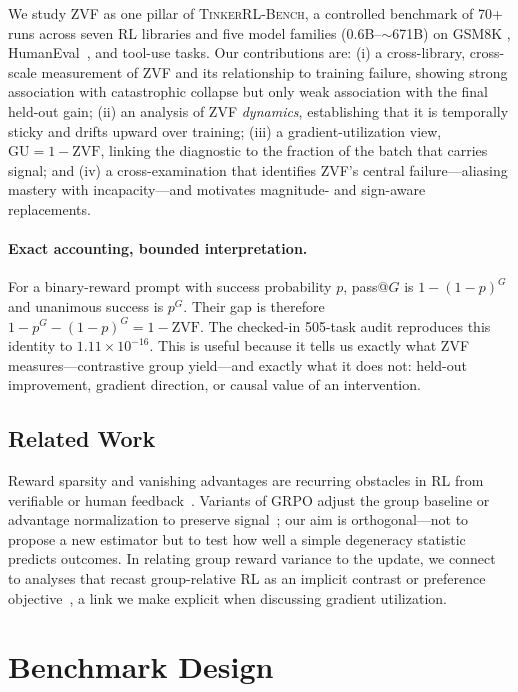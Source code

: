 \documentclass{article}
\newcommand{\ours}{\textsc{TinkerRL-Bench}}
\begin{document}
We study ZVF as one pillar of \ours{}, a controlled benchmark of 70+ runs across
seven RL libraries and five model families ($0.6$B--$\sim$671B) on GSM8K
\citep{cobbe2021training}, HumanEval~\citep{chen2021codex}, and tool-use tasks.
Our contributions are: (i) a cross-library, cross-scale measurement of ZVF and its
relationship to training failure, showing strong association with catastrophic
collapse but only weak association with the final held-out gain; (ii) an analysis
of ZVF \emph{dynamics}, establishing that it is temporally sticky and drifts upward
over training; (iii) a gradient-utilization view, $\mathrm{GU} = 1 - \mathrm{ZVF}$,
linking the diagnostic to the fraction of the batch that carries signal; and (iv) a
cross-examination that identifies ZVF's central failure---aliasing mastery with
incapacity---and motivates magnitude- and sign-aware replacements.

\paragraph{Exact accounting, bounded interpretation.}
For a binary-reward prompt with success probability $p$, pass@$G$ is
$1-(1-p)^G$ and unanimous success is $p^G$. Their gap is therefore
$1-p^G-(1-p)^G=1-\mathrm{ZVF}$. The checked-in 505-task audit reproduces this
identity to $1.11\times10^{-16}$. This is useful because it tells us exactly
what ZVF measures---contrastive group yield---and exactly what it does not:
held-out improvement, gradient direction, or causal value of an intervention.

\subsection{Related Work}
\label{sec:p2-related}
Reward sparsity and vanishing advantages are recurring obstacles in RL from
verifiable or human feedback~\citep{christiano2017deeprlhf, ouyang2022training, ahmadian2024backtobasics}. Variants of GRPO adjust the group baseline or advantage
normalization to preserve signal~\citep{lin2025cppo, gift2025, liu2025rlsubnetworks};
our aim is orthogonal---not to propose a new estimator but to test how well a
simple degeneracy statistic predicts outcomes. In relating group reward variance
to the update, we connect to analyses that recast group-relative RL as an implicit
contrast or preference objective~\citep{wu2025grpo_dpo, liu2026gdpo}, a link we make
explicit when discussing gradient utilization.
 \section{Benchmark Design}
\label{sec:benchmark}
\end{document}
